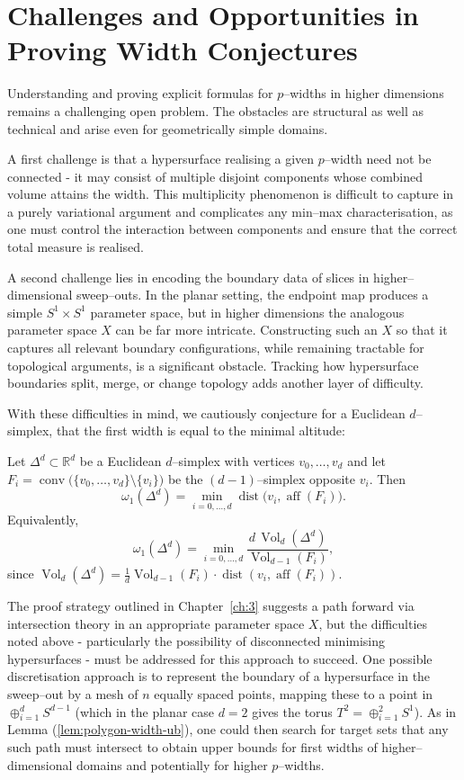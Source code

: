 \section{Challenges and Opportunities in Proving Width Conjectures}

Understanding and proving explicit formulas for $p$--widths in higher dimensions remains a challenging open problem. The obstacles are structural as well as technical and arise even for geometrically simple domains.

\noindent A first challenge is that a hypersurface realising a given $p$–width need not be connected - it may consist of multiple disjoint components whose combined volume attains the width. This multiplicity phenomenon is difficult to capture in a purely variational argument and complicates any min--max characterisation, as one must control the interaction between components and ensure that the correct total measure is realised.

\noindent A second challenge lies in encoding the boundary data of slices in higher--dimensional sweep--outs.  In the planar setting, the endpoint map produces a simple $S^1 \times S^1$ parameter space, but in higher dimensions the analogous parameter space $X$ can be far more intricate. Constructing such an $X$ so that it captures all relevant boundary configurations, while remaining tractable for topological arguments, is a significant obstacle. Tracking how hypersurface boundaries split, merge, or change topology adds another layer of difficulty.

\noindent With these difficulties in mind, we cautiously conjecture for a Euclidean $d$–simplex, that the first width is equal to the minimal altitude:
\begin{conjecture}\label{conjecture1}
Let $\Delta^d\subset\mathbb{R}^d$ be a Euclidean $d$–simplex with vertices 
$v_0,\dots,v_d$ and let 
$F_i=\operatorname{conv}\big(\{v_0,\dots,v_d\}\setminus\{v_i\}\big)$ 
be the $(d-1)$–simplex opposite $v_i$. Then
\[
  \omega_1(\Delta^d) = \min_{i=0,\dots,d}\operatorname{dist}\big(v_i,\operatorname{aff}(F_i)\big).
\]
Equivalently,
\[
  \omega_1(\Delta^d) = \min_{i=0,\dots,d}\frac{d\,\operatorname{Vol}_d(\Delta^d)}{\operatorname{Vol}_{d-1}(F_i)},
\]
since 
$\operatorname{Vol}_d(\Delta^d)
 =\tfrac{1}{d}\operatorname{Vol}_{d-1}(F_i)\cdot 
  \operatorname{dist}(v_i,\operatorname{aff}(F_i))$.
\end{conjecture}

\noindent The proof strategy outlined in Chapter~\ref{ch:3} suggests a path forward via intersection theory in an appropriate parameter space $X$, but the difficulties noted above - particularly the possibility of disconnected minimising hypersurfaces - must be addressed for this approach to succeed. One possible discretisation approach is to represent the boundary of a hypersurface in the sweep--out by a mesh of $n$ equally spaced points, mapping these to a point in $\oplus_{i=1}^d S^{d-1}$ (which in the planar case $d=2$ gives the torus $T^2 = \oplus_{i=1}^2 S^1$). As in Lemma (\ref{lem:polygon-width-ub}), one could then search for target sets that any such path must intersect to obtain upper bounds for first widths of higher–dimensional domains and potentially for higher $p$–widths.

